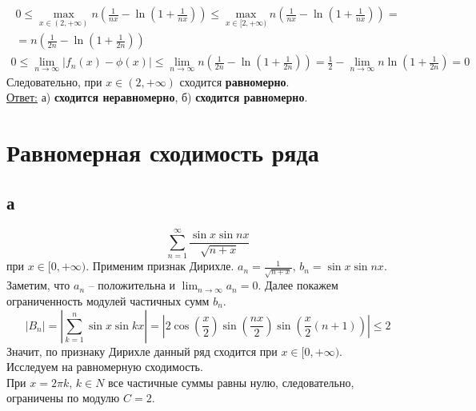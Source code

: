 \documentclass[a5paper, 10pt]{article}
\theoremstyle{definition}
\theoremstyle{plain}
\theoremstyle{remark}
\begin{document}
\begin{multline*}
0 \leq \max \limits_{x \in (2, + \infty) }  n \left( \frac{1}{nx}- \ln \left( 1+ \frac{1}{nx} \right)  \right) \leq \max \limits_{x \in [2, + \infty) }  n \left( \frac{1}{nx}- \ln \left( 1+ \frac{1}{nx} \right)  \right) =\\
=  n \left( \frac{1}{2n}- \ln \left( 1+ \frac{1}{2n} \right)  \right)
\end{multline*}
\begin{multline*}
0 \leq \lim_{n \to \infty} \left| f_n (x) - \phi(x)  \right| \leq \lim_{n \to \infty} n \left( \frac{1}{2n}- \ln \left( 1+ \frac{1}{2n} \right)  \right) =
 \frac{1}{2} - \lim_{n \to \infty} n \ln \left( 1+ \frac{1}{2n} \right)  = 0
\end{multline*}
Следовательно, при $x \in (2, + \infty)$ сходится \textbf{равномерно}.\\

\underline{Ответ:}  а) \textbf{сходится неравномерно}, б) \textbf{сходится равномерно}.


\newpage
\section{Равномерная сходимость ряда}
\subsection{а}
\begin{equation*}
\sum  \limits_{n = 1}^{\infty} \frac{\sin x \sin nx}{\sqrt{n + x}}
\end{equation*}
при $ x \in [0, + \infty)$.
Применим признак Дирихле. $a_n = \frac{1}{\sqrt{n + x}}, \, b_n = \sin x \sin nx$. Заметим, что $a_n$ -- положительна и $\lim_{n \to \infty} a_n = 0$. Далее покажем ограниченность модулей частичных сумм $ b_n$.
\begin{equation*}
\left| B_n \right| = \left| \sum  \limits_{k = 1}^{n}  \sin x \sin kx \right| = \left|  2 \cos \left(\frac{x}{2}\right) \sin \left(\frac{nx}{2}\right) \sin \left(\frac{x}{2}(n+1)\right) \right| \leq 2
\end{equation*}
Значит, по признаку Дирихле данный ряд сходится при $ x \in [0, + \infty)$.\\
Исследуем на равномерную сходимость. \\
При $x = 2 \pi k, \, k \in N$ все частичные суммы равны нулю, следовательно, ограничены по модулю $C=2$.
\end{document}
